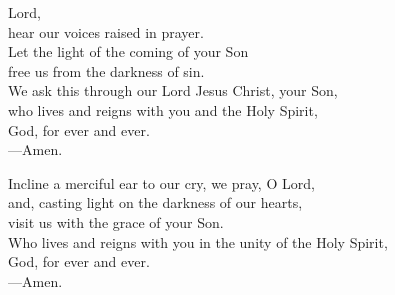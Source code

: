 \prayer


\begin{prayerverse}
Lord,\\
hear our voices raised in prayer.\\
Let the light of the coming of your Son\\
free us from the darkness of sin.\\
We ask this through our Lord Jesus Christ, your Son,\\
who lives and reigns with you and the Holy Spirit,\\
God, for ever and ever.\\
{\color{red}---\thinspace}Amen.
\end{prayerverse}


\begin{prayerverse}
Incline a merciful ear to our cry, we pray, O Lord,\\
and, casting light on the darkness of our hearts,\\
visit us with the grace of your Son.\\
Who lives and reigns with you in the unity of the Holy Spirit,\\
God, for ever and ever.\\
{\color{red}---\thinspace}Amen.
\end{prayerverse}

